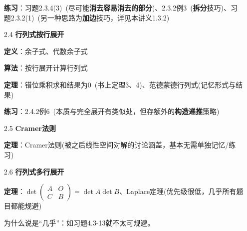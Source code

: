 \documentclass[a4paper,UTF8,fontset=windows]{ctexart}
\newcommand*{\note}{\noindent *}
\begin{document}
\begin{enumerate}
    \textbf{练习}：习题2.3.4(3)\ (尽可能\textbf{消去容易消去的部分})、2.3.2例3\ (\textbf{拆分}技巧)、习题2.3.2(1)\ (另一种思路为\textbf{加边}技巧，详见本讲义1.3.2)

    \item[2.4] \textbf{行列式按行展开}
    
    \textbf{定义}：余子式、代数余子式
    
    \textbf{算法}：按行展开计算行列式

    \textbf{定理}：错位乘积求和结果为0\ (书上定理3、4)、范德蒙德行列式(记忆形式与结果)

    \textbf{练习}：2.4.2例6\ (本质与完全展开有类似处，但存额外的\textbf{构造递推}策略)

    \item[2.5] \textbf{Cramer法则}
    
    \textbf{定理}：Cramer法则(被之后线性空间对解的讨论涵盖，基本无需单独记忆/练习)

    \item[2.6] \textbf{行列式多行展开}
    
    \textbf{定理}：$\det\begin{pmatrix}A&O\\C&B\end{pmatrix}=\det A\det B$、Laplace定理(优先级很低，几乎所有题目都能规避)

    \note 为什么说是``几乎''：如习题4.3-13就不太可规避。
    
\end{enumerate}
\end{document}
